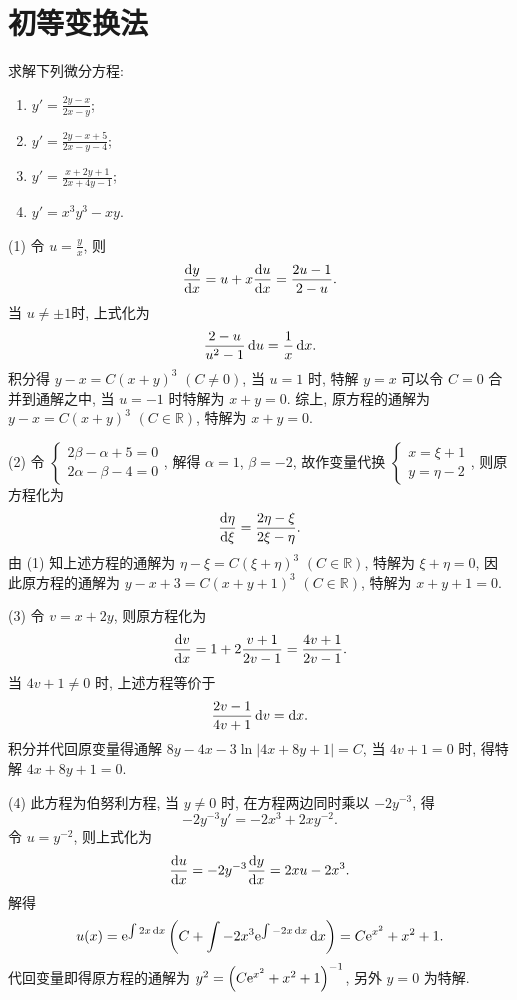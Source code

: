\section{初等变换法}



\begin{exercise}
  求解下列微分方程:
  \begin{enumerate}[(1)]
  \item $\displaystyle y'=\frac{2y-x}{2x-y}$;
  \item $\displaystyle y'=\frac{2y-x+5}{2x-y-4}$;
  \item $\displaystyle y'=\frac{x+2y+1}{2x+4y-1}$;
  \item $\displaystyle y'=x^3y^3-xy$.
  \end{enumerate}
\end{exercise}

\begin{solve}
  (1) 令 $u=\frac{y}{x}$, 则
  \[\frac{\mathop{}\!\mathrm{d} y}{\mathop{}\!\mathrm{d} x}=u+x\frac{\mathop{}\!\mathrm{d} u}{\mathop{}\!\mathrm{d} x}=\frac{2u-1}{2-u}.\]
  当 $u\neq\pm 1$时, 上式化为
  \[\frac{2-u}{u^2-1}\mathop{}\!\mathrm{d} u = \frac{1}{x}\mathop{}\!\mathrm{d} x.\]
  积分得 $y-x=C(x+y)^3$ $(C\neq 0)$, 
  当 $u=1$ 时, 特解 $y=x$ 可以令 $C=0$ 合并到通解之中, 当 $u=-1$ 时特解为 $x+y=0$.
  综上, 原方程的通解为 $y-x=C(x+y)^3$ $(C\in\mathbb{R})$, 特解为 $x+y=0$.

  (2) 令 $\begin{cases}2\beta-\alpha+5=0\\2\alpha-\beta-4=0\end{cases}$,
  解得 $\alpha=1$, $\beta=-2$,
  故作变量代换 $\begin{cases}x=\xi+1\\y=\eta-2\end{cases}$, 则原方程化为
  \[\frac{\mathop{}\!\mathrm{d}\eta}{\mathop{}\!\mathrm{d}\xi}=\frac{2\eta-\xi}{2\xi-\eta}.\]
  由 (1) 知上述方程的通解为 $\eta-\xi=C(\xi+\eta)^3$ $(C\in\mathbb{R})$, 特解为 $\xi+\eta=0$,
  因此原方程的通解为 $y-x+3=C(x+y+1)^3$ $(C\in\mathbb{R})$, 特解为 $x+y+1=0$.

  (3) 令 $v=x+2y$, 则原方程化为
  \[\frac{\mathop{}\!\mathrm{d} v}{\mathop{}\!\mathrm{d} x}=1+2\frac{v+1}{2v-1}=\frac{4v+1}{2v-1}.\]
  当 $4v+1\neq 0$ 时, 上述方程等价于
  \[\frac{2v-1}{4v+1}\mathop{}\!\mathrm{d} v=\mathop{}\!\mathrm{d} x.\]
  积分并代回原变量得通解 $8y-4x-3\ln|4x+8y+1|=C$, 当 $4v+1=0$ 时, 得特解 $4x+8y+1=0$.

  (4) 此方程为伯努利方程, 当 $y\neq 0$ 时, 在方程两边同时乘以 $-2y^{-3}$, 得
  \[-2y^{-3}y'=-2x^3+2xy^{-2}.\]
  令 $u=y^{-2}$, 则上式化为
  \[\frac{\mathop{}\!\mathrm{d} u}{\mathop{}\!\mathrm{d} x}=-2y^{-3}\frac{\mathop{}\!\mathrm{d} y}{\mathop{}\!\mathrm{d} x}=2xu-2x^3.\]
  解得
  \[u(x)=\mathrm{e}^{\int2x\mathop{}\!\mathrm{d} x}\left(C+\int-2x^3\mathrm{e}^{\int-2x\mathop{}\!\mathrm{d} x}\mathop{}\!\mathrm{d} x\right)=C\mathrm{e}^{x^2}+x^2+1.\]
  代回变量即得原方程的通解为 $y^2=\left(C\mathrm{e}^{x^2}+x^2+1\right)^{-1}$, 另外 $y=0$ 为特解.
\end{solve}



